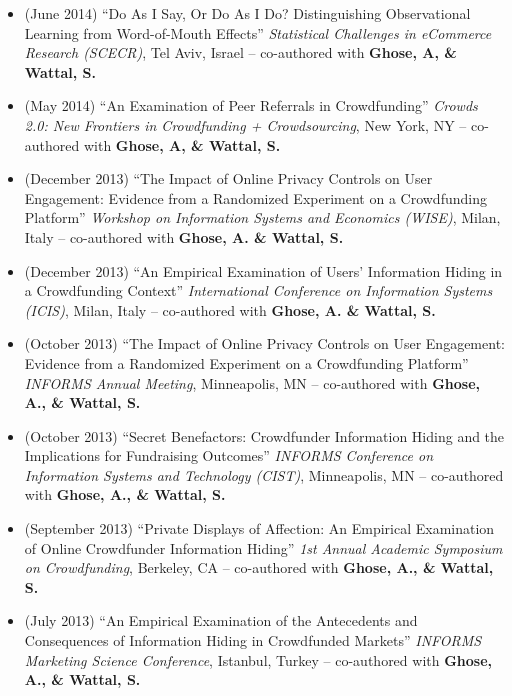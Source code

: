 \documentclass[10.5pt,letterpaper,sans]{moderncv}        %
\begin{document}
\begin{itemize}
\item (June 2014) ``Do As I Say, Or Do As I Do? Distinguishing Observational Learning from Word-of-Mouth Effects'' \textit{Statistical Challenges in eCommerce Research (SCECR)}, Tel Aviv, Israel -- co-authored with \textbf{Ghose, A, \& Wattal, S.}

\item (May 2014) ``An Examination of Peer Referrals in Crowdfunding'' \textit{Crowds 2.0: New Frontiers in Crowdfunding + Crowdsourcing}, New York, NY -- co-authored with \textbf{Ghose, A, \& Wattal, S.}

\item (December 2013) ``The Impact of Online Privacy Controls on User Engagement: Evidence from a Randomized Experiment on a Crowdfunding Platform'' \textit{Workshop on Information Systems and Economics (WISE)}, Milan, Italy -- co-authored with \textbf{Ghose, A. \& Wattal, S.}

\item (December 2013) ``An Empirical Examination of Users' Information Hiding in a Crowdfunding Context'' \textit{International Conference on Information Systems (ICIS)}, Milan, Italy -- co-authored with \textbf{Ghose, A. \& Wattal, S.}

\item (October 2013) ``The Impact of Online Privacy Controls on User Engagement: Evidence from a Randomized Experiment on a Crowdfunding Platform'' \textit{INFORMS Annual Meeting}, Minneapolis, MN -- co-authored with \textbf{Ghose, A., \& Wattal, S.}

\item (October 2013) ``Secret Benefactors: Crowdfunder Information Hiding and the Implications for Fundraising Outcomes'' \textit{INFORMS Conference on Information Systems and Technology (CIST)}, Minneapolis, MN -- co-authored with \textbf{Ghose, A., \& Wattal, S.}

\item (September 2013) ``Private Displays of Affection: An Empirical Examination of Online Crowdfunder Information Hiding'' \textit{1st Annual Academic Symposium on Crowdfunding}, Berkeley, CA -- co-authored with \textbf{Ghose, A., \& Wattal, S.}

\item (July 2013) ``An Empirical Examination of the Antecedents and Consequences of Information Hiding in Crowdfunded Markets'' \textit{INFORMS Marketing Science Conference}, Istanbul, Turkey -- co-authored with \textbf{Ghose, A., \& Wattal, S.}


\end{itemize}
\end{document}
